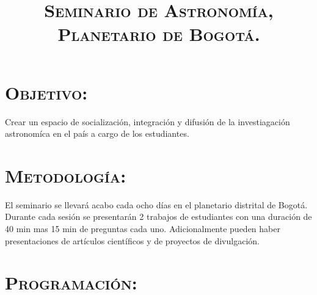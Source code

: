 \documentclass[12pt]{article}
\title{\textsc{Seminario de Astronom\'ia,\\ Planetario de Bogot\'a.}}
\begin{document}
\date{}
\maketitle

\section*{\textsc{Objetivo:}}
Crear un espacio de socializaci\'on, integraci\'on y difusi\'on de la investiagaci\'on astronom\'ica en el pa\'is
a cargo de los estudiantes.     

\section*{\textsc{Metodolog\'ia:}}
El seminario se llevar\'a acabo cada ocho d\'ias en el planetario distrital de Bogot\'a.
Durante cada sesi\'on se presentar\'an 2  trabajos de estudiantes con una duraci\'on de 40 min mas 15 min de 
preguntas cada uno. Adicionalmente pueden haber presentaciones de art\'iculos cient\'ificos y de proyectos de divulgaci\'on.


\section*{\textsc{Programaci\'on:}}
\end{document}
